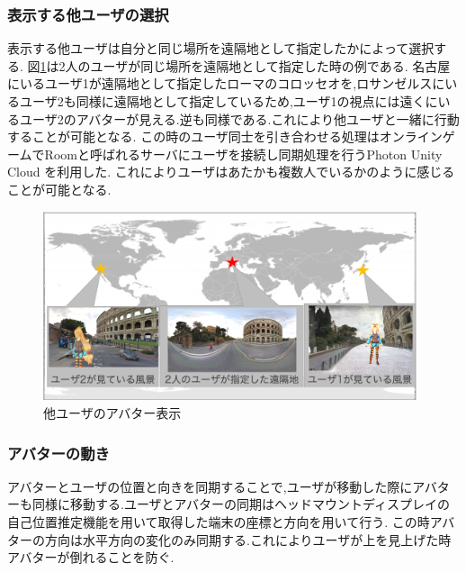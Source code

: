\subsubsection{表示する他ユーザの選択}
表示する他ユーザは自分と同じ場所を遠隔地として指定したかによって選択する.
図\ref{figure:avatershare}は2人のユーザが同じ場所を遠隔地として指定した時の例である.
名古屋にいるユーザ1が遠隔地として指定したローマのコロッセオを,ロサンゼルスにいるユーザ2も同様に遠隔地として指定しているため,ユーザ1の視点には遠くにいるユーザ2のアバターが見える.逆も同様である.これにより他ユーザと一緒に行動することが可能となる.
この時のユーザ同士を引き合わせる処理はオンラインゲームでRoomと呼ばれるサーバにユーザを接続し同期処理を行うPhoton Unity Cloud を利用した\cite{photon}.
これによりユーザはあたかも複数人でいるかのように感じることが可能となる.

\begin{figure}[htbp]
\begin{center}
\includegraphics[width=11cm]{img/02_proposedmethod/shareava.eps} 
\end{center}
\caption{他ユーザのアバター表示}
\label{figure:avatershare}
\end{figure} 

\clearpage

\subsubsection{アバターの動き}
アバターとユーザの位置と向きを同期することで,ユーザが移動した際にアバターも同様に移動する.ユーザとアバターの同期はヘッドマウントディスプレイの自己位置推定機能を用いて取得した端末の座標と方向を用いて行う.
この時アバターの方向は水平方向の変化のみ同期する.これによりユーザが上を見上げた時アバターが倒れることを防ぐ.

\clearpage





